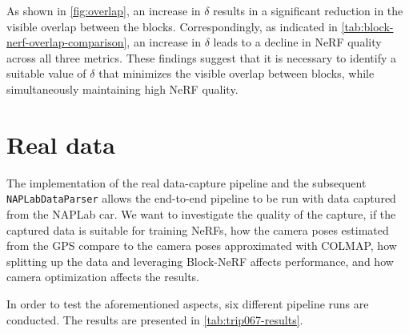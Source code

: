 


As shown in \autoref{fig:overlap}, an increase in $\delta$ results in a significant reduction in the visible overlap between the blocks. Correspondingly, as indicated in \autoref{tab:block-nerf-overlap-comparison}, an increase in $\delta$ leads to a decline in NeRF quality across all three metrics. These findings suggest that it is necessary to identify a suitable value of $\delta$ that minimizes the visible overlap between blocks, while simultaneously maintaining high NeRF quality.
















\section{Real data}
The implementation of the real data-capture pipeline and the subsequent \texttt{NAPLabDataParser} allows the end-to-end pipeline to be run with data captured from the NAPLab car. We want to investigate the quality of the capture, if the captured data is suitable for training NeRFs, how the camera poses estimated from the GPS compare to the camera poses approximated with COLMAP, how splitting up the data and leveraging Block-NeRF affects performance, and how camera optimization affects the results.

In order to test the aforementioned aspects, six different pipeline runs are conducted. The results are presented in \autoref{tab:trip067-results}.


